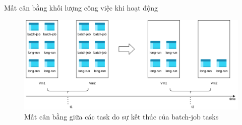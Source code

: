 \documentclass[11pt,xcolor={dvipsnames}, aspectratio=169]{beamer}
\begin{document}


\begin{frame}
{Mất cân bằng khối lượng công việc khi hoạt động}
\begin{figure}
	\centering
	\includegraphics[scale=0.5]{images/unload_balancing.png}
	\caption{Mất cân bằng giữa các task do sự kết thúc của batch-job tasks}
	\label{fig:unload_balancing}
\end{figure}
\end{frame}


\end{document}

